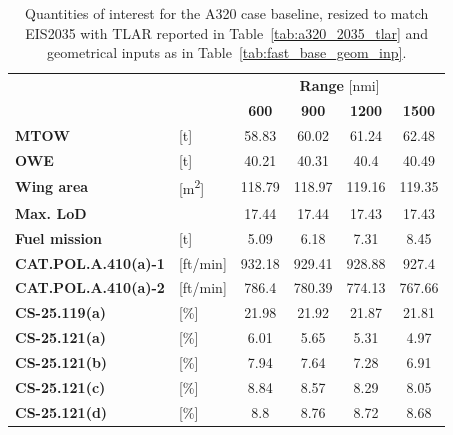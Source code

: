 \begin{table}[!h]
	\centering
	\begin{tabular}{l l c c c c}
		\cline{3-6}
		& & \multicolumn{4}{c}{\textbf{Range} [nmi]} \\
		& & \textbf{600} & \textbf{900} & \textbf{1200} & \textbf{1500} \\
		\hline
		\textbf{MTOW} & [\si{\tonne}] & 58.83 & 60.02 & 61.24 & 62.48 \\
		\textbf{OWE} & [\si{\tonne}] & 40.21 & 40.31 & 40.4 & 40.49  \\
		\textbf{Wing area} & [\si{\square\meter}] & 118.79 & 118.97 & 119.16 & 119.35 \\
		\textbf{Max. LoD} & & 17.44 & 17.44 & 17.43 & 17.43 \\
		\textbf{Fuel mission} & [\si{\tonne}] & 5.09 & 6.18 & 7.31 & 8.45 \\
		\hline
		\textbf{CAT.POL.A.410(a)-1} & [ft/min] & 932.18 & 929.41 & 928.88 & 927.4 \\
		\textbf{CAT.POL.A.410(a)-2} & [ft/min] & 786.4 & 780.39 & 774.13 & 767.66 \\
		\textbf{CS-25.119(a)} & [\%] & 21.98 & 21.92 & 21.87 & 21.81 \\
		\textbf{CS-25.121(a)} & [\%] & 6.01 & 5.65 & 5.31 & 4.97 \\
		\textbf{CS-25.121(b)} & [\%] & 7.94 & 7.64 & 7.28 & 6.91 \\
		\textbf{CS-25.121(c)} & [\%] & 8.84 & 8.57 & 8.29 & 8.05 \\
		\textbf{CS-25.121(d)} & [\%] & 8.8 & 8.76 & 8.72 & 8.68 \\
		\hline
	\end{tabular}
	\caption{Quantities of interest for the A320 case baseline, resized to match EIS2035 with TLAR reported in Table~\ref{tab:a320_2035_tlar} and geometrical inputs as in Table~\ref{tab:fast_base_geom_inp}.}
	\label{tab:a320_2035_non_optim_res}
\end{table}

